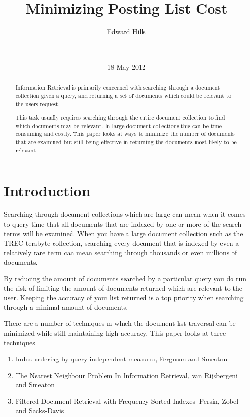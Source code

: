 \documentclass{acm_proc_article-sp}
\begin{document}
\title{Minimizing Posting List Cost}

\author{
\alignauthor
Edward Hills\\\\
       \\
       }
\date{18 May 2012}

\maketitle
\begin{abstract}

Information Retrieval is primarily concerned with searching through a document collection given a query, and returning a set of documents which could be relevant to the users request. 

This task usually requires searching through the entire document collection to find which documents may be relevant. In large document collections this can be time consuming and costly. This paper looks at ways to minimize the number of documents that are examined but still being effective in returning the documents most likely to be relevant.

\end{abstract}

\section{Introduction}

Searching through document collections which are large can mean when it comes to query time that all documents that are indexed by one or more of the search terms will be examined. When you have a large document collection such as the TREC terabyte collection, searching every document that is indexed by even a relatively rare term can mean searching through thousands or even millions of documents.

By reducing the amount of documents searched by a particular query you do run the risk of limiting the amount of documents returned which are relevant to the user. Keeping the accuracy of your list returned is a top priority when searching through a minimal amount of documents. 

There are a number of techniques in which the document list traversal can be minimized while still maintaining high accuracy. This paper looks at three techniques: 
\begin{enumerate}
\item Index ordering by query-independent measures, Ferguson and Smeaton \cite{Ferguson:2012}
\item The Nearest Neighbour Problem In Information Retrieval, van Rijsbergeni and Smeaton \cite{Smeaton:1981}
\item Filtered Document Retrieval with Frequency-Sorted Indexes, Persin, Zobel and Sacks-Davis \cite{Persin:1996}
\end{enumerate}
\end{document}
